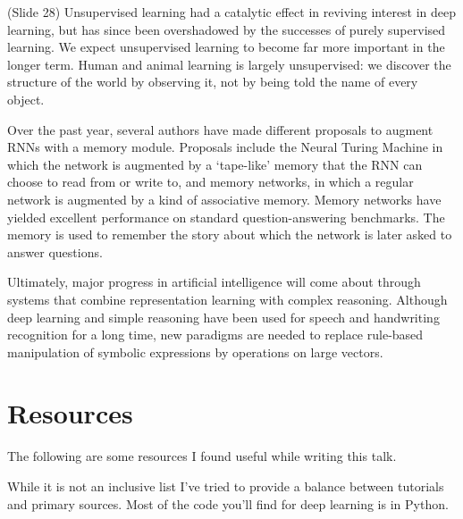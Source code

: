 \documentclass[twocolumn]{article}
\begin{document}
(Slide 28) Unsupervised learning had a catalytic effect in reviving interest in
deep learning, but has since been overshadowed by the successes of purely
supervised learning. We expect unsupervised learning to become far more
important in the longer term. Human and animal learning is largely unsupervised:
we discover the structure of the world by observing it, not by being told the
name of every object.

Over the past year, several authors have made different proposals to  augment
RNNs with a memory module. Proposals include the Neural Turing Machine in which
the network is augmented by a ‘tape-like’ memory that the RNN can choose to
read from or write to, and memory networks, in which a regular network is
augmented by a kind of associative memory. Memory networks have yielded
excellent performance on standard question-answering benchmarks. The memory is
used to remember the story about which the network is later asked to answer
questions.

Ultimately, major progress in artificial intelligence will come about through
systems that combine representation learning with complex reasoning. Although
deep learning and simple reasoning have been used for speech and handwriting
recognition for a long time, new paradigms are needed to replace rule-based
manipulation of symbolic expressions by operations on large vectors.

\section{Resources}
The following are some resources I found useful while writing this talk.

While it is not an inclusive list I've tried to provide a balance between
tutorials and primary sources. Most of the code you'll find for deep learning is
in Python.
\end{document}
